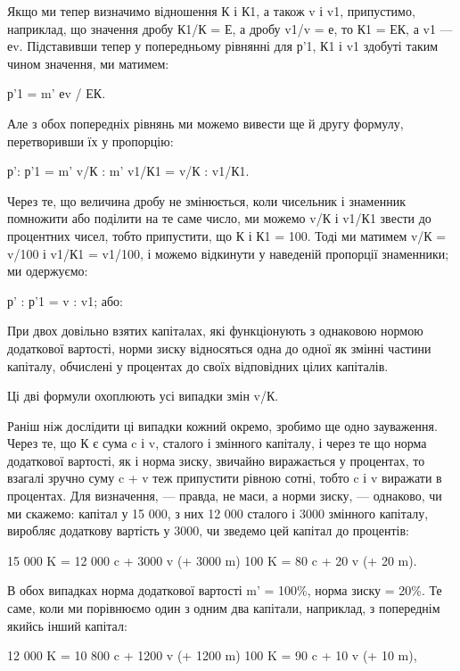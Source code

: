 Якщо ми тепер визначимо відношення К і К1, а також
v і v1, припустимо, наприклад, що значення дробу К1/К = Е, а дробу
v1/v = е, то К1 = ЕК, а v1 — еv. Підставивши тепер у попередньому
рівнянні для р'1, К1 і v1 здобуті таким чином значення,
ми матимем:

р'1 = m' еv / ЕК.

Але з обох попередніх рівнянь ми можемо вивести ще й другу
формулу, перетворивши їх у пропорцію:

р': р'1 = m' v/К : m' v1/К1 = v/К : v1/К1.

Через те, що величина дробу не змінюється, коли чисельник
і знаменник помножити або поділити на те саме число, ми можемо
v/К і v1/К1 звести до процентних чисел, тобто припустити, що
К і К1 = 100. Тоді ми матимем v/К = v/100 і v1/К1 = v1/100, і можемо відкинути
у наведеній пропорції знаменники; ми одержуємо:

р' : р'1 = v : v1; або:

При двох довільно взятих капіталах, які функціонують з однаковою
нормою додаткової вартості, норми зиску відносяться
одна до одної як змінні частини капіталу, обчислені у процентах
до своїх відповідних цілих капіталів.

Ці дві формули охоплюють усі випадки змін v/К.

Раніш ніж дослідити ці випадки кожний окремо, зробимо
ще одно зауваження. Через те, що К є сума c і v, сталого і змінного
капіталу, і через те що норма додаткової вартості, як
і норма зиску, звичайно виражається у процентах, то взагалі
зручно суму c + v теж припустити рівною сотні, тобто c і v
виражати в процентах. Для визначення, — правда, не маси, а
норми зиску, — однаково, чи ми скажемо: капітал у 15 000,
з них 12 000 сталого і 3000 змінного капіталу, виробляє додаткову
вартість у 3000, чи зведемо цей капітал до процентів:

15 000 K = 12 000 c + 3000 v (+ 3000 m)
100 K = 80 c + 20 v (+ 20 m).

В обох випадках норма додаткової вартості m' = 100\%, норма
зиску = 20\%.
Те саме, коли ми порівнюємо один з одним два капітали,
наприклад, з попереднім якийсь інший капітал:

12 000 K = 10 800 c + 1200 v (+ 1200 m)
100 K = 90 c + 10 v (+ 10 m),

